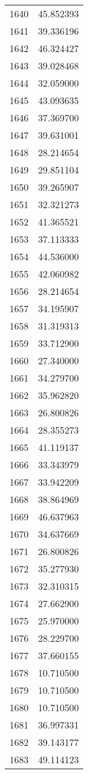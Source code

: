 \documentclass[12pt]{article}
\begin{document}
\begin{longtable}{@{}cc@{}}
1640 & 45.852393 \\
1641 & 39.336196 \\
1642 & 46.324427 \\
1643 & 39.028468 \\
1644 & 32.059000 \\
1645 & 43.093635 \\
1646 & 37.369700 \\
1647 & 39.631001 \\
1648 & 28.214654 \\
1649 & 29.851104 \\
1650 & 39.265907 \\
1651 & 32.321273 \\
1652 & 41.365521 \\
1653 & 37.113333 \\
1654 & 44.536000 \\
1655 & 42.060982 \\
1656 & 28.214654 \\
1657 & 34.195907 \\
1658 & 31.319313 \\
1659 & 33.712900 \\
1660 & 27.340000 \\
1661 & 34.279700 \\
1662 & 35.962820 \\
1663 & 26.800826 \\
1664 & 28.355273 \\
1665 & 41.119137 \\
1666 & 33.343979 \\
1667 & 33.942209 \\
1668 & 38.864969 \\
1669 & 46.637963 \\
1670 & 34.637669 \\
1671 & 26.800826 \\
1672 & 35.277930 \\
1673 & 32.310315 \\
1674 & 27.662900 \\
1675 & 25.970000 \\
1676 & 28.229700 \\
1677 & 37.660155 \\
1678 & 10.710500 \\
1679 & 10.710500 \\
1680 & 10.710500 \\
1681 & 36.997331 \\
1682 & 39.143177 \\
1683 & 49.114123 \\

\end{longtable}
\end{document}
